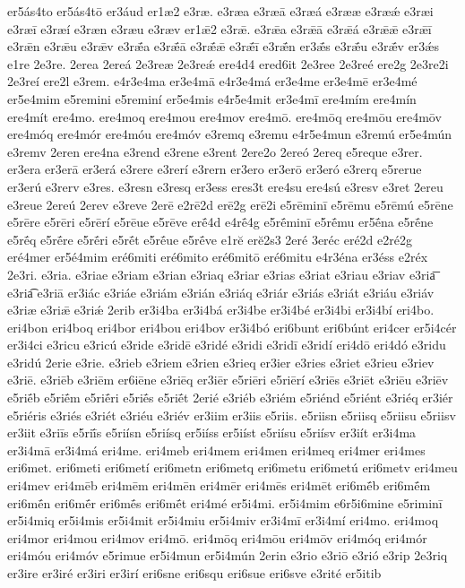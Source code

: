 {er5ás4to
er5ás4tō
er3áud
er1æ2
e3ræ.
e3ræa
e3ræā
e3ræá
e3rææ
e3ræǽ
e3ræi
e3ræī
e3ræí
e3ræn
e3ræu
e3ræv
er1ǣ2
e3rǣ.
e3rǣa
e3rǣā
e3rǣá
e3rǣǣ
e3rǣī
e3rǣn
e3rǣu
e3rǣv
e3rǣ́a
e3rǣ́ā
e3rǣ́ǣ
e3rǣ́ī
e3rǣ́n
er3ǣ́s
e3rǣ́u
e3rǣ́v
er3ǽs
e1re
2e3re.
2erea
2ereá
2e3reæ
2e3reǽ
ere4d4
ered6it
2e3ree
2e3reé
ere2g
2e3re2i
2e3reí
ere2l
e3rem.
e4r3e4ma
er3e4mā
e4r3e4má
er3e4me
er3e4mē
er3e4mé
er5e4mim
e5remini
e5reminí
er5e4mis
e4r5e4mit
er3e4mī
ere4mím
ere4mín
ere4mít
ere4mo.
ere4moq
ere4mou
ere4mov
ere4mō.
ere4mōq
ere4mōu
ere4mōv
ere4móq
ere4mór
ere4móu
ere4móv
e3remq
e3remu
e4r5e4mun
e3remú
er5e4mún
e3remv
2eren
ere4na
e3rend
e3rene
e3rent
2ere2o
2ereó
2ereq
e5reque
e3rer.
er3era
er3erā
er3erá
e3rere
e3rerí
e3rern
er3ero
er3erō
er3eró
e3rerq
e5rerue
er3erú
e3rerv
e3res.
e3resn
e3resq
er3ess
eres3t
ere4su
ere4sú
e3resv
e3ret
2ereu
e3reue
2ereú
2erev
e3reve
2erē
e2rē2d
erē2g
erē2i
e5rēminī
e5rēmu
e5rēmú
e5rēne
e5rēre
e5rēri
e5rērí
e5rēue
e5rēve
erḗ4d
e4rḗ4g
e5rḗminī
e5rḗmu
er5ḗna
e5rḗne
e5rḗq
e5rḗre
e5rḗri
e5rḗt
e5rḗue
e5rḗve
e1rĕ
erĕ2s3
2eré
3eréc
eré2d
e2ré2g
eré4mer
er5é4mim
eré6miti
eré6mito
eré6mitō
eré6mitu
e4r3éna
er3éss
e2réx
2e3ri.
e3ria.
e3riae
e3riam
e3rian
e3riaq
e3riar
e3rias
e3riat
e3riau
e3riav
e3ria͞
e3ria͡
e3riā
er3iác
e3riáe
e3riám
e3rián
e3riáq
e3riár
e3riás
e3riát
e3riáu
e3riáv
e3riæ
e3riǣ
e3riǽ
2erib
er3i4ba
er3i4bá
er3i4be
er3i4bé
er3i4bi
er3i4bí
eri4bo.
eri4bon
eri4boq
eri4bor
eri4bou
eri4bov
er3i4bó
eri6bunt
eri6búnt
eri4cer
er5i4cér
er3i4ci
e3ricu
e3ricú
e3ride
e3ridē
e3ridé
e3ridi
e3ridī
e3ridí
eri4dō
eri4dó
e3ridu
e3ridú
2erie
e3rie.
e3rieb
e3riem
e3rien
e3rieq
er3ier
e3ries
e3riet
e3rieu
e3riev
e3riē.
e3riēb
e3riēm
er6iēne
e3riēq
er3iēr
e5riēri
e5riērí
e3riēs
e3riēt
e3riēu
e3riēv
e5riḗb
e5riḗm
e5riḗri
e5riḗs
e5riḗt
2erié
e3riéb
e3riém
e5riénd
e5riént
e3riéq
er3iér
e5riéris
e3riés
e3riét
e3riéu
e3riév
er3iim
er3iis
e5riis.
e5riisn
e5riisq
e5riisu
e5riisv
er3iit
e3riīs
e5riī́s
e5riísn
e5riísq
er5iíss
er5iíst
e5riísu
e5riísv
er3iít
er3i4ma
er3i4mā
er3i4má
eri4me.
eri4meb
eri4mem
eri4men
eri4meq
eri4mer
eri4mes
eri6met.
eri6meti
eri6metí
eri6metn
eri6metq
eri6metu
eri6metú
eri6metv
eri4meu
eri4mev
eri4mēb
eri4mēm
eri4mēn
eri4mēr
eri4mēs
eri4mēt
eri6mḗb
eri6mḗm
eri6mḗn
eri6mḗr
eri6mḗs
eri6mḗt
eri4mé
er5i4mi.
er5i4mim
e6r5i6mine
e5riminī
er5i4miq
er5i4mis
er5i4mit
er5i4miu
er5i4miv
er3i4mī
er3i4mí
eri4mo.
eri4moq
eri4mor
eri4mou
eri4mov
eri4mō.
eri4mōq
eri4mōu
eri4mōv
eri4móq
eri4mór
eri4móu
eri4móv
e5rimue
er5i4mun
er5i4mún
2erin
e3rio
e3riō
e3rió
e3rip
2e3riq
er3ire
er3iré
er3iri
er3irí
eri6sne
eri6squ
eri6sue
eri6sve
e3rité
er5itib
}
